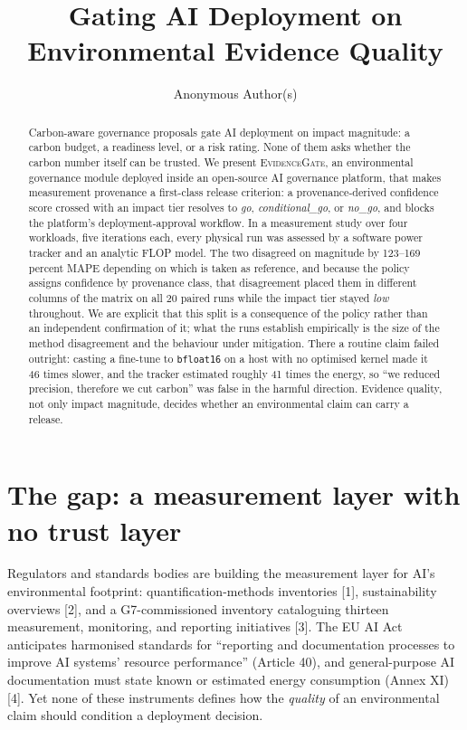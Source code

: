 \documentclass{article}
\title{Gating AI Deployment on Environmental Evidence Quality}
\author{Anonymous Author(s)}
\newcommand{\sysname}{\textsc{EvidenceGate}}
\newcommand{\platname}{an open-source AI governance platform}
\begin{document}
\maketitle

\begin{abstract}
Carbon-aware governance proposals gate AI deployment on impact magnitude: a
carbon budget, a readiness level, or a risk rating. None of them asks whether
the carbon number itself can be trusted. We present \sysname, an environmental
governance module deployed inside \platname, that makes measurement provenance
a first-class release criterion: a provenance-derived confidence score crossed
with an impact tier resolves to \emph{go}, \emph{conditional\_go}, or
\emph{no\_go}, and blocks the platform's deployment-approval workflow. In a
measurement study over four workloads, five iterations each, every physical run
was assessed by a software power tracker and an analytic FLOP model. The two
disagreed on magnitude by 123--169 percent MAPE depending on which is taken as
reference, and because the policy assigns confidence by provenance class, that
disagreement placed them in different columns of the matrix on all 20 paired
runs while the impact tier stayed \emph{low} throughout. We are explicit that
this split is a consequence of the policy rather than an independent
confirmation of it; what the runs establish empirically is the size of the
method disagreement and the behaviour under mitigation. There a routine claim
failed outright: casting a fine-tune to \texttt{bfloat16} on a host with no
optimised kernel made it 46 times slower, and the tracker estimated roughly 41
times the energy, so ``we reduced precision, therefore we cut carbon'' was
false in the harmful direction. Evidence quality,
not only impact magnitude, decides whether an environmental claim can carry a
release.
\end{abstract}

\section{The gap: a measurement layer with no trust layer}

Regulators and standards bodies are building the measurement layer for AI's
environmental footprint: quantification-methods inventories [1],
sustainability overviews [2], and a G7-commissioned inventory cataloguing
thirteen measurement, monitoring, and reporting initiatives [3]. The EU AI Act
anticipates harmonised standards for ``reporting and documentation processes
to improve AI systems' resource performance'' (Article 40), and
general-purpose AI documentation must state known or estimated energy
consumption (Annex XI) [4]. Yet none of these instruments defines how the
\emph{quality} of an environmental claim should condition a deployment
decision.
\end{document}
